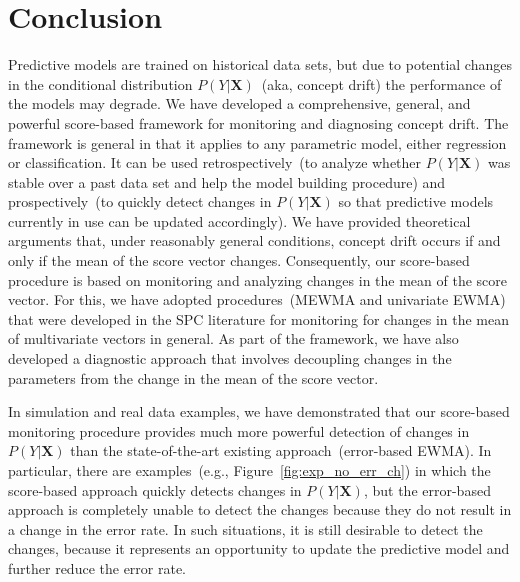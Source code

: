 \documentclass[twoside,11pt]{article}
\begin{document}
\section{Conclusion}
Predictive models are trained on historical data sets, but due to potential changes in the conditional distribution $P (Y|\bm {X})$~(aka, concept drift) the performance of the models may degrade. We have developed a comprehensive, general, and powerful score-based framework for monitoring and diagnosing concept drift. The framework is general in that it applies to any parametric model, either regression or classification. It can be used retrospectively~(to analyze whether $P (Y|\bm {X})$ was stable over a past data set and help the model building procedure) and prospectively~(to quickly detect changes in $P (Y|\bm {X})$ so that predictive models currently in use can be updated accordingly). We have provided theoretical arguments that, under reasonably general conditions, concept drift occurs if and only if the mean of the score vector changes. Consequently, our score-based procedure is based on monitoring and analyzing changes in the mean of the score vector. For this, we have adopted procedures~(MEWMA and univariate EWMA) that were developed in the SPC literature for monitoring for changes in the mean of multivariate vectors in general. As part of the framework, we have also developed a diagnostic approach that involves decoupling changes in the parameters from the change in the mean of the score vector. 

In simulation and real data examples, we have demonstrated that our score-based monitoring procedure provides much more powerful detection of changes in $P (Y|\bm {X})$ than the state-of-the-art existing approach~(error-based EWMA). In particular, there are examples~(e.g., Figure~\ref{fig:exp_no_err_ch}) in which the score-based approach quickly detects changes in $P (Y|\bm {X})$, but the error-based approach is completely unable to detect the changes because they do not result in a change in the error rate. In such situations, it is still desirable to detect the changes, because it represents an opportunity to update the predictive model and further reduce the error rate. 

\acks{}

\end{document}
